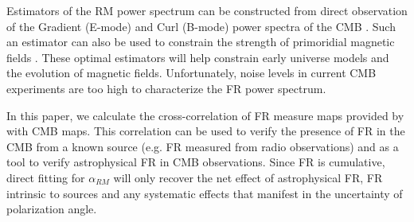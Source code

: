 \documentclass[usenatbib,hidelinks]{mnras}
\begin{document}
{Estimators of the RM power spectrum can be constructed from direct observation of the Gradient (E-mode) and Curl (B-mode) power spectra of the CMB \citep{ Gluscevic:2009, Kamionkowski2008fp, Yadav2009, De:2013, pogosian:2013}.
Such an estimator can also be used to constrain the strength of primoridial magnetic fields \citep{pogosian:2013,Ade:2015cao,planck:2015pmf}. 
These optimal estimators will help constrain early universe models and the evolution of magnetic fields.
Unfortunately, noise levels in current CMB experiments are too high to characterize the FR power spectrum. 

In this paper, we calculate the cross-correlation of FR measure maps provided by \citet{Oppermann:2014} with CMB maps. 
 This correlation can be used to verify the presence of FR in the CMB from a known source (e.g. FR measured from radio observations) and as a tool to verify astrophysical FR in CMB observations. 
Since FR is cumulative, direct fitting for $\alpha_{RM}$ will only recover the net effect of astrophysical FR, 
FR intrinsic to sources
and any systematic effects that manifest in the uncertainty of polarization angle. 


}
\end{document}
